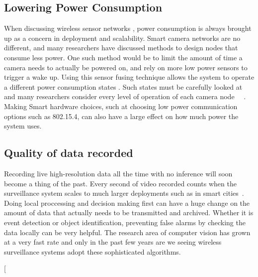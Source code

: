 \documentclass[journal,transmag]{IEEEtran}
\begin{document}
\subsection{Lowering Power Consumption}
When discussing wireless sensor networks , power consumption is always brought up as a concern in deployment and scalability. Smart camera networks are 
no different, and many researchers have discussed methods to design nodes that consume less power. One such method would be to limit the amount of time 
a camera needs to actually be powered on, and rely on more low power sensors to trigger a wake up. Using this sensor fusing technique allows the system
to operate a different power consumption states . Such states must be carefully looked at and many researchers 
consider every level of operation of each camera node ~\cite{AccLatEnergy}~\cite{EnergyCons}. Making Smart hardware choices, such at choosing low power communication
options such as 802.15.4, can also have a large effect on how much power the system uses.

\subsection{Quality of data recorded}
Recording live high-resolution data all the time with no inference will soon become a thing of the past. Every second of video recorded counts when the 
surveillance system scales to much larger deployments such as in smart cities~\cite{HuSIMS}. Doing local proccessing and decision making first can have 
a huge change on the amount of data that actually needs to be transmitted and archived. Whether it is event detection or object identification, preventing 
false alarms by checking the data locally can be very helpful. The research area of computer vision has grown at a very fast rate and only in the past few years
are we seeing wireless surveillance systems adopt these sophisticated algorithms.


\twocolumn[
\end{document}
